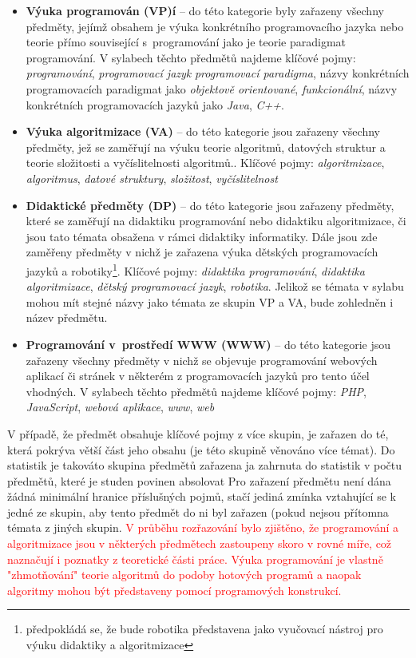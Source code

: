 \documentclass[FP,DP]{tulthesis}
\begin{document}
{{{{{{{\vspace{2mm}\begin{itemize}
\setlength\itemsep{0.2em}
  	\item \textbf{Výuka programován (VP)í} -- do této kategorie byly zařazeny všechny předměty, jejímž obsahem je výuka konkrétního programovacího jazyka nebo teorie přímo související s~programování jako je teorie paradigmat programování. V sylabech těchto předmětů najdeme klíčové pojmy: \textit{programování}, \textit{programovací jazyk} \textit{programovací paradigma}, názvy konkrétních programovacích paradigmat jako \textit{objektově orientované}, \textit{funkcionální},  názvy konkrétních programovacích jazyků jako \textit{Java}, \textit{C++}.
\item \textbf{Výuka algoritmizace  (VA)} -- do této kategorie jsou zařazeny všechny předměty, jež se zaměřují na výuku teorie algoritmů, datových struktur a teorie složitosti a vyčíslitelnosti algoritmů.. Klíčové pojmy: \textit{algoritmizace}, \textit{algoritmus}, \textit{datové struktury}, \textit{složitost}, \textit{vyčíslitelnost}
\item \textbf{Didaktické předměty (DP)} -- do této kategorie jsou zařazeny předměty, které se zaměřují na didaktiku programování nebo didaktiku algoritmizace, či jsou tato témata obsažena v rámci didaktiky informatiky. Dále jsou zde zaměřeny předměty v nichž je zařazena výuka dětských programovacích jazyků a robotiky\footnote{předpokládá se, že bude robotika představena jako vyučovací nástroj pro výuku didaktiky a algoritmizace}. Klíčové pojmy: \textit{didaktika programování}, \textit{didaktika algoritmizace}, \textit{dětský programovací jazyk}, \textit{robotika}. Jelikož se témata v sylabu mohou mít stejné názvy jako témata ze skupin VP a VA, bude zohledněn i název předmětu.
	\item \textbf{Programování v~prostředí WWW (WWW)} -- do této kategorie jsou zařazeny všechny předměty v nichž se objevuje programování webových aplikací či stránek v některém z programovacích jazyků pro tento účel vhodných. V sylabech těchto předmětů najdeme klíčové pojmy: \textit{PHP}, \textit{JavaScript}, \textit{webová aplikace}, \textit{www}, \textit{web}
\end{itemize}
V případě, že předmět obsahuje klíčové pojmy z více skupin, je zařazen do té, která pokrýva větší část jeho obsahu (je této skupině věnováno více témat). Do statistik je takováto skupina předmětů zařazena ja zahrnuta do statistik v počtu předmětů, které je studen povinen absolovat  Pro zařazení předmětu není dána žádná minimální hranice příslušných pojmů, stačí jediná zmínka vztahující se k jedné ze skupin, aby tento předmět do ni byl zařazen (pokud nejsou přítomna témata z jiných skupin. \textcolor{red}{V průběhu rozřazování bylo zjištěno, že programování a algoritmizace jsou v některých předmětech zastoupeny skoro v rovné míře, což naznačují i poznatky z teoretické části práce. Výuka programování je vlastně "zhmotňování" teorie algoritmů do podoby hotových programů a naopak algoritmy mohou být představeny pomocí programových konstrukcí.}
\begin{figure}[h!]
\centering
{}


\end{figure}}}}}}}}
\end{document}
